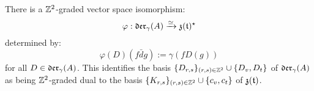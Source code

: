         \begin{proposition} \label{prop: yangian_div_zero_vector_fields_are_graded_dual_to_toroidal_centre}
            There is a $\mathbb{Z}^2$-graded vector space isomorphism:
                $$\varphi: \mathfrak{der}_{\gamma}(A) \xrightarrow[]{\simeq} \mathfrak{z}(\mathfrak{t})^{\star}$$
            determined by:
                $$\varphi(D)( f\bar{d}g ) := \gamma( f D(g) )$$
            for all $D \in \mathfrak{der}_{\gamma}(A)$. This identifies the basis $\{D_{r, s}\}_{(r, s) \in \mathbb{Z}^2} \cup \{D_v, D_t\}$ of $\mathfrak{der}_{\gamma}(A)$ as being $\mathbb{Z}^2$-graded dual to the basis $\{K_{r, s}\}_{(r, s) \in \mathbb{Z}^2} \cup \{c_v, c_t\}$ of $\mathfrak{z}(\mathfrak{t})$.
        \end{proposition}
